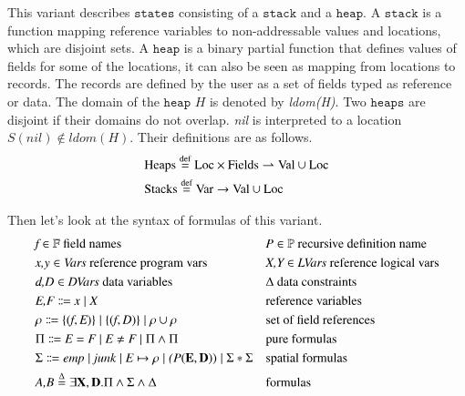 \documentclass{article}
\theoremstyle{plain}
\begin{document}
This variant describes $\mathtt{states}$ consisting of a $\mathtt{stack}$ and a $\mathtt{heap}$. A $\mathtt{stack}$ is a function mapping reference variables to non-addressable values and locations, which are disjoint sets. A $\mathtt{heap}$ is a binary partial function that defines values of fields for some of the locations, it can also be seen as mapping from locations to records. The records are defined by the user as a set of fields typed as reference or data. The domain of the $\mathtt{heap}$  $H$ is denoted by \textit{ldom(H)}. Two $\mathtt{heaps}$ are disjoint if their domains do not overlap. \textit{nil} is interpreted to a location $\mathit{S(nil) \notin ldom(H)}$. Their definitions are as follows.
\begin{equation*}
\begin{split}
& \mathrm{Heaps \buildrel \text{d{}ef}\over= Loc \times Fields \rightharpoonup Val\cup Loc} \\
& \mathrm{Stacks \buildrel \text{d{}ef}\over= Var \to Val \cup Loc}
\end{split}
\end{equation*}

Then let's look at the syntax of formulas of this variant.
\begin{align*}
&\emph{f} \in \mathbb{F} \ \text{field names} & &\emph{P} \in \mathbb{P} \ \text{recursive definition name}\\
&\emph{x,y} \in \emph{Vars} \ \text{reference program vars}& &\emph{X,Y} \in \emph{LVars} \ \text{reference logical vars}\\
&\emph{d,D} \in \emph{DVars} \ \text{data\ variables}& &\Delta \ \text{data constraints}\\
&\emph{E,F} \Coloneqq \emph{x} \mid \emph{X} & &\text{reference  variables}\\
&\rho \Coloneqq \{(\emph{f},\emph{E})\} \mid \{(\emph{f},\emph{D})\}  \mid \rho\cup \rho & &\text{set of field references}\\
&\Pi \Coloneqq \emph{E}=\emph{F} \mid\emph{E}\ne\emph{F}  \mid \Pi \wedge  \Pi & &\text{pure formulas}\\
&\Sigma \Coloneqq \emph{emp} \mid \emph{junk} \mid \emph{E} \mapsto \rho \mid \emph(P(\mathbf{E},\mathbf{D})) \mid \Sigma *\Sigma & &\text{spatial formulas}\\
&\emph{A,B} \overset{\Delta}{=} \exists \mathbf{X},\mathbf{D}. \Pi \wedge  \Sigma  \wedge  \Delta & &\text{formulas}\\
\end{align*}
\end{document}
